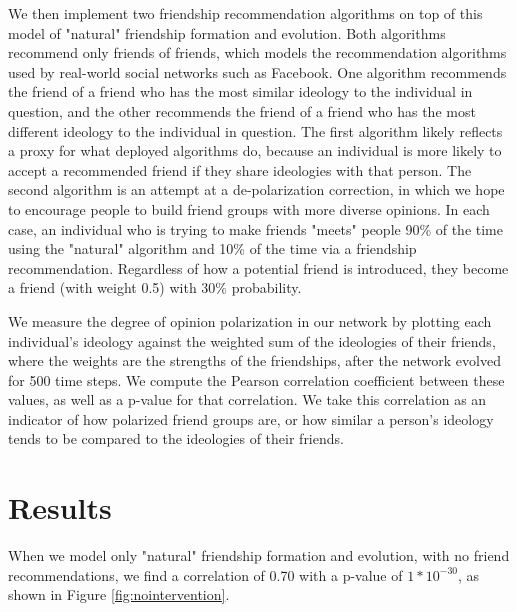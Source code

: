 \documentclass[12pt,letterpaper]{article}
\begin{document}
We then implement two friendship recommendation algorithms on top of this model of "natural" friendship formation and evolution. Both algorithms recommend only friends of friends, which models the recommendation algorithms used by real-world social networks such as Facebook. One algorithm recommends the friend of a friend who has the most similar ideology to the individual in question, and the other recommends the friend of a friend who has the most different ideology to the individual in question. The first algorithm likely reflects a proxy for what deployed algorithms do, because an individual is more likely to accept a recommended friend if they share ideologies with that person. The second algorithm is an attempt at a de-polarization correction, in which we hope to encourage people to build friend groups with more diverse opinions. In each case, an individual who is trying to make friends "meets" people 90\% of the time using the "natural" algorithm and 10\% of the time via a friendship recommendation. Regardless of how a potential friend is introduced, they become a friend (with weight 0.5) with 30\% probability.

We measure the degree of opinion polarization in our network by plotting each individual's ideology against the weighted sum of the ideologies of their friends, where the weights are the strengths of the friendships, after the network evolved for 500 time steps. We compute the Pearson correlation coefficient between these values, as well as a p-value for that correlation. We take this correlation as an indicator of how polarized friend groups are, or how similar a person's ideology tends to be compared to the ideologies of their friends.

\section{Results}

When we model only "natural" friendship formation and evolution, with no friend recommendations, we find a correlation of 0.70 with a p-value of $1*10^{-30}$, as shown in Figure \ref{fig:nointervention}.
\end{document}
